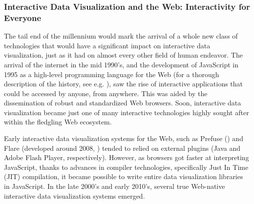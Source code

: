 \documentclass[
]{book}
\theoremstyle{definition}
\theoremstyle{definition}
\theoremstyle{definition}
\theoremstyle{definition}
\theoremstyle{remark}
\begin{document}
\subsubsection{Interactive Data Visualization and the Web: Interactivity for Everyone}\label{interactive-data-visualization-and-the-web-interactivity-for-everyone}

The tail end of the millennium would mark the arrival of a whole new class of technologies that would have a significant impact on interactive data visualization, just as it had on almost every other field of human endeavor. The arrival of the internet in the mid 1990's, and the development of JavaScript in 1995 as a high-level programming language for the Web (for a thorough description of the history, see e.g. ), saw the rise of interactive applications that could be accessed by anyone, from anywhere. This was aided by the dissemination of robust and standardized Web browsers. Soon, interactive data visualization became just one of many interactive technologies highly sought after within the fledgling Web ecosystem.

Early interactive data visualization systems for the Web, such as Prefuse () and Flare (developed around 2008, ) tended to relied on external plugins (Java and Adobe Flash Player, respectively). However, as browsers got faster at interpreting JavaScript, thanks to advances in compiler technologies, specifically Just In Time (JIT) compilation, it became possible to write entire data visualization libraries in JavaScript. In the late 2000's and early 2010's, several true Web-native interactive data visualization systems emerged.
\end{document}
